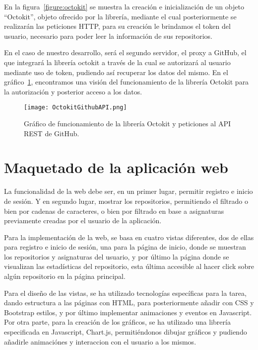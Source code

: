 En la figura~\ref{figure:octokit} se muestra la creación e inicialización
de un objeto “Octokit”, objeto ofrecido por la librería, mediante el cual
posteriormente se realizarán las peticiones HTTP, para su creación le
brindamos el token del usuario, necesario para poder leer la información de
sus repositorios.

En el caso de nuestro desarrollo, será el segundo servidor, el proxy a GitHub, el que integrará la librería octokit a través de la cual se autorizará al usuario mediante uso de token, pudiendo así recuperar los datos del mismo. En el gráfico~\ref{figure:octokitGitApi}, encontramos una visión del funcionamiento de la librería Octokit para la autorización y posterior acceso a los datos. 
\begin{figure}[h!]
  \texttt{[image: OctokitGithubAPI.png]}
  \caption{Gráfico de funcionamiento de la librería Octokit y peticiones al API REST de GitHub.}
  \label{figure:octokitGitApi}
\end{figure}  


\section{Maquetado de la aplicación web}

La funcionalidad de la web debe ser, en un primer lugar, permitir registro
e inicio de sesión. Y en segundo lugar, mostrar los repositorios,
permitiendo el filtrado o bien por cadenas de caracteres, o bien por
filtrado en base a asignaturas previamente creadas por el usuario de la
aplicación.

Para la implementación de la web, se basa en cuatro vistas diferentes, dos
de ellas para registro e inicio de sesión, una para la página de inicio,
donde se muestran los repositorios y asignaturas del usuario, y por último
la página donde se visualizan las estadísticas del repositorio, esta última
accesible al hacer click sobre algún repositorio en la página principal.

Para el diseño de las vistas, se ha utilizado tecnologías específicas para
la tarea, dando estructura a las páginas con HTML, para posteriormente
añadir con CSS\cite{GradienteCSS} y Bootstrap\cite{Bootstrap} estilos, y
por último implementar animaciones y eventos en Javascript. Por otra parte,
para la creación de los gráficos, se ha utilizado una librería especificada
en Javascript, Chart.js\cite{ChartJS,ChartJSIntro}, permitiéndonos dibujar
gráficos y pudiendo añadirle animaciónes y interaccion con el usuario a los
mismos.

